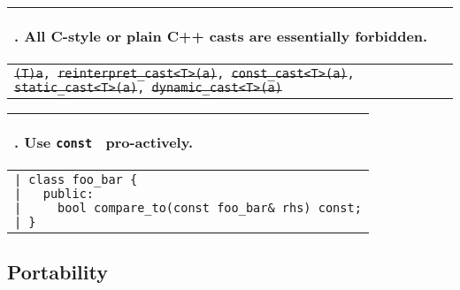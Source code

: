\documentclass[10pt]{article}
\newcommand{\code}[1]{\color[rgb]{0.2,0.8,0.2}\texttt{#1}\color[rgb]{0,0,0} }
\newcounter {iCommandment}
\newcommand{\CorG}[5]
{
\begin{table}[H]
\begin{center}
\begin{tabular}{| p{12cm} |}
\hline
#1. #2 \\
\hline
\vspace{-0.1cm}
\parbox{12cm}{\code{#3}} \\
\vspace{-0.2cm}
#4 \\
#5 \\
\hline
\end{tabular}
\end{center}
\end{table}
}
\newcommand{\Commandment}[4]
{
\CorG{\textbf{\arabic{iCommandment}}\addtocounter{iCommandment}{1}}
{\textbf{#1}}{#2}{#3}{#4}
}
\begin{document}
\Commandment
{All C-style or plain C++ casts are essentially forbidden.}
{\sout{(T)a}, \sout{reinterpret\_cast<T>(a)}, \sout{const\_cast<T>(a)}, \sout{static\_cast<T>(a)}, \sout{dynamic\_cast<T>(a)}}
{
Both the C-style cast and the \code{reinterpret\_cast}\ have undefined behavior and are thus 
forbidden. The \code{const\_cast}\ operator can always be avoided, use the \code{mutable}\ qualifier on 
an exceptional data member that needs to change even within a const member function of a class.
The \code{static\_cast}\ operator is almost always avoidable by design, but it can be used to avoid 
warning messages like ``comparing signed and unsigned type''. For conversions, use the explicit conversion
operator, i.e. \code{T(a)}, instead of a static cast. For doing static casting of pointers, use the Boost 
casting operator for the smart-pointers, that is, \code{boost::static\_pointer\_cast}. 
The \code{dynamic\_cast}\ operator must not be used in ReaK. First, dynamic casting is usually a sign
of bad design and is most often avoidable by design. If not avoidable and since ReaK should use smart-pointers
almost exclusively (especially for polymorphic classes, for which a dynamic cast could be required), a plain
C++ dynamic cast is not appropriate. Finally, ReaK uses its own RTTI system (Run-time Type Identification) 
and not that of C++, and thus, the \code{boost::static\_pointer\_cast}\ operator is not appropriate either because it 
uses the C++ RTTI. So, for dynamic casting in ReaK, use the \code{ReaK::rtti::rk\_dynamic\_ptr\_cast}\ operator, 
which has the exact same effect as the Boost or plain C++ versions, but using ReaK's RTTI and smart-pointers.}
{\ }

\Commandment
{Use \code{const}\ pro-actively.}
{|\ class foo\_bar \{\\
|\ \ \ public:\\
|\ \ \ \ \ bool compare\_to(const foo\_bar\& rhs) const;\\
|\ \}
}
{The \code{const}\ qualifier is an integral part of the interfaces of functions and variable types. ReaK promotes 
a proactive use of this qualifier and since it has a infectious quality (thanks to the nice and strict type rules in C++), 
if you want to program in the ReaK library (or any other decent library), learn to program with const-correctness in mind.}
{\ }


\subsection{Portability}
\end{document}
